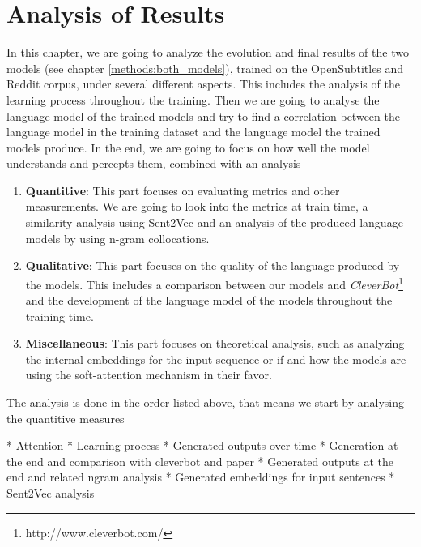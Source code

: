 \chapter{Analysis of Results}
In this chapter, we are going to analyze the evolution and final results of the two models (see chapter \ref{methods:both_models}), trained on the OpenSubtitles and Reddit corpus, under several different aspects. This includes the analysis of the learning process throughout the training. Then we are going to analyse the language model of the trained models and try to find a correlation between the language model in the training dataset and the language model the trained models produce. In the end, we are going to focus on how well the model understands and percepts them, combined with an analysis

\begin{enumerate}[noitemsep]
	\item \textbf{Quantitive}: This part focuses on evaluating metrics and other measurements. We are going to look into the metrics at train time, a similarity analysis using Sent2Vec and an analysis of the produced language models by using n-gram collocations.
	\item \textbf{Qualitative}: This part focuses on the quality of the language produced by the models. This includes a comparison between our models and \emph{CleverBot}\footnote{http://www.cleverbot.com/} and the development of the language model of the models throughout the training time.
	\item \textbf{Miscellaneous}: This part focuses on theoretical analysis, such as analyzing the internal embeddings for the input sequence or if and how the models are using the soft-attention mechanism in their favor.
\end{enumerate}

The analysis is done in the order listed above, that means we start by analysing the quantitive measures
\blindtext

* Attention
* Learning process
* Generated outputs over time
* Generation at the end and comparison with cleverbot and paper
* Generated outputs at the end and related ngram analysis
* Generated embeddings for input sentences
* Sent2Vec analysis

